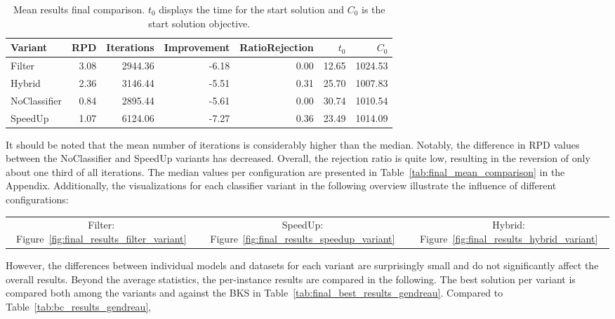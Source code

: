 \begin{table}
    \centering
    \small
    \begin{tabular}{lrrrrrr}
        \toprule
        Variant      & RPD  & Iterations & Improvement & RatioRejection & $t_0$ & $C_0$   \\
        \midrule
        Filter       & 3.08 & 2944.36    & -6.18       & 0.00           & 12.65 & 1024.53 \\
        Hybrid       & 2.36 & 3146.44    & -5.51       & 0.31           & 25.70 & 1007.83 \\
        NoClassifier & 0.84 & 2895.44    & -5.61       & 0.00           & 30.74 & 1010.54 \\
        SpeedUp      & 1.07 & 6124.06    & -7.27       & 0.36           & 23.49 & 1014.09 \\
        \bottomrule
    \end{tabular}
    \caption[Mean results final comparison.]{Mean results final comparison. $t_0$ displays the time for the start solution and $C_0$ is the start solution objective.}
    \label{tab:mean_final_results}
\end{table}
It should be noted that the mean number of iterations is considerably higher than the median. Notably, the difference in \gls{RPD}
values between the NoClassifier and SpeedUp variants has decreased. Overall, the rejection ratio is quite low, resulting in
the reversion of only about one third of all iterations. The median values per configuration are presented in
Table~\ref{tab:final_mean_comparison} in the Appendix. Additionally, the visualizations for each classifier variant in the following overview
illustrate the influence of different configurations:
\begin{table}[ht]
    \centering
    \setlength{\tabcolsep}{12pt}
    \begin{tabular}{ccc}
        Filter: Figure~\ref{fig:final_results_filter_variant} & SpeedUp: Figure~\ref{fig:final_results_speedup_variant} & Hybrid: Figure~\ref{fig:final_results_hybrid_variant}
    \end{tabular}
\end{table}
However, the differences between individual models and datasets for each variant are surprisingly small and do not significantly
affect the overall results. Beyond the average statistics, the per-instance results are compared in the following. The best solution
per variant is compared both among the variants and against the \gls{BKS} in Table~\ref{tab:final_best_results_gendreau}. Compared to Table~\ref{tab:bc_results_gendreau},
